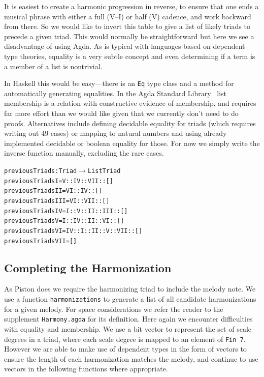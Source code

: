 It is easiest to create a harmonic progression in reverse, to
ensure that one ends a musical phrase with either a full (V--I) or half (V)
cadence, and work backward from there. So we would like to invert this
table to give a list of likely triads to precede a given triad. This
would normally be straightforward but here we see a disadvantage of
using Agda. As is typical with languages based on dependent type
theories, equality is a very subtle concept and even determining if a
term is a member of a list is nontrivial.

In Haskell this would be easy---there is an \texttt{Eq} type class and a
method for automatically generating equalities. In the Agda Standard
Library~\citep{agda-stdlib} list membership is a relation with
constructive evidence of membership, and requires far more effort than we
would like given that we currently don't need to do
proofs. Alternatives include defining decidable equality for triads
(which requires writing out 49 cases) or mapping to natural numbers
and using already implemented decidable or boolean equality for
those. For now we simply write the inverse function manually,
excluding the rare cases.

\begin{alltt}
previousTriads : Triad \(\rightarrow\) List Triad
previousTriads I   = V :: IV :: VII :: []
previousTriads II  = VI :: IV :: []
previousTriads III = VI :: VII :: []
previousTriads IV  = I :: V :: II :: III :: []
previousTriads V   = I :: IV :: II :: VI :: []
previousTriads VI  = IV :: I :: II :: V :: VII :: []
previousTriads VII = []
\end{alltt}

\subsection{Completing the Harmonization}
\label{sec:harmony:complete}

As Piston does we require the harmonizing triad to include the melody
note. We use a function \texttt{harmonizations} to generate a list of
all candidate harmonizations for a given melody. For space
considerations we refer the reader to the supplement
\texttt{Harmony.agda} for its definition. Here again we encounter difficulties
with equality and membership. We use a bit vector to represent the
set of scale degrees in a triad, where each scale degree is mapped to
an element of \texttt{Fin 7}. However we are able to make use of
dependent types in the form of vectors to ensure the length of each
harmonization matches the melody, and continue to use vectors in the
following functions where appropriate.

